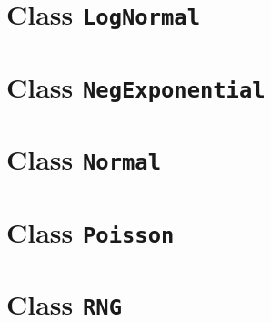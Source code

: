 \documentclass{report}
\begin{document}
\clearpage
\chapter{Class {\tt LogNormal}}



\clearpage
\chapter{Class {\tt NegExponential}}



\clearpage
\chapter{Class {\tt Normal}}



\clearpage
\chapter{Class {\tt Poisson}}



\clearpage
\chapter{Class {\tt RNG}}



%
\end{document}
